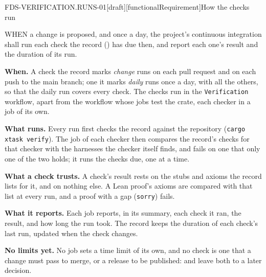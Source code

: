 \begin{requirement}{FDS-VERIFICATION.RUNS-01}[draft][functionalRequirement]{How the checks run}


  WHEN a change is proposed, and once a day, the project's continuous
  integration shall run each check the record
  () has due then, and report each one's
  result and the duration of its run.

  \textbf{When.} A check the record marks \emph{change} runs on each pull
  request and on each push to the main branch; one it marks \emph{daily}
  runs once a day, with all the others, so that the daily run covers every
  check. The checks run in the \texttt{Verification} workflow, apart from the
  workflow whose jobs test the crate, each checker in a job of its own.

  \textbf{What runs.} Every run first checks the record against the
  repository (\texttt{cargo xtask verify}). The job of each checker then
  compares the record's checks for that checker with the harnesses the
  checker itself finds, and fails on one that only one of the two holds;
  it runs the checks due, one at a time.

  \textbf{What a check trusts.} A check's result rests on the stubs and
  axioms the record lists for it, and on nothing else. A Lean proof's axioms
  are compared with that list at every run, and a proof with a gap
  (\texttt{sorry}) fails.

  \textbf{What it reports.} Each job reports, in its summary, each check it
  ran, the result, and how long the run took. The record keeps the duration
  of each check's last run, updated when the check changes.

  \textbf{No limits yet.} No job sets a time limit of its own, and no check
  is one that a change must pass to merge, or a release to be published:
   and
   leave both to a later decision.



\end{requirement}
